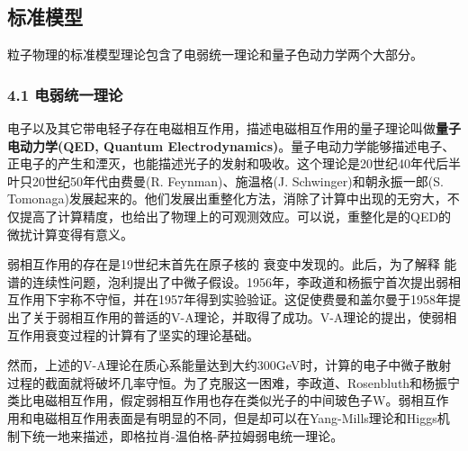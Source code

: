 \subsection{标准模型}
粒子物理的标准模型理论包含了电弱统一理论和量子色动力学两个大部分。

\subsubsection{4.1 电弱统一理论}
电子以及其它带电轻子存在电磁相互作用，描述电磁相互作用的量子理论叫做\textbf{量子电动力学(QED, Quantum Electrodynamics)}。量子电动力学能够描述电子、正电子的产生和湮灭，也能描述光子的发射和吸收。这个理论是20世纪40年代后半叶只20世纪50年代由费曼(R. Feynman)、施温格(J. Schwinger)和朝永振一郎(S. Tomonaga)发展起来的。他们发展出重整化方法，消除了计算中出现的无穷大，不仅提高了计算精度，也给出了物理上的可观测效应。可以说，重整化是的QED的微扰计算变得有意义。

弱相互作用的存在是19世纪末首先在原子核的 衰变中发现的。此后，为了解释 能谱的连续性问题，泡利提出了中微子假设。1956年，李政道和杨振宁首次提出弱相互作用下宇称不守恒，并在1957年得到实验验证。这促使费曼和盖尔曼于1958年提出了关于弱相互作用的普适的V-A理论，并取得了成功。V-A理论的提出，使弱相互作用衰变过程的计算有了坚实的理论基础。

然而，上述的V-A理论在质心系能量达到大约300GeV时，计算的电子中微子散射过程的截面就将破坏几率守恒。为了克服这一困难，李政道、Rosenbluth和杨振宁类比电磁相互作用，假定弱相互作用也存在类似光子的中间玻色子W。弱相互作用和电磁相互作用表面是有明显的不同，但是却可以在Yang-Mills理论和Higgs机制下统一地来描述，即格拉肖-温伯格-萨拉姆弱电统一理论。